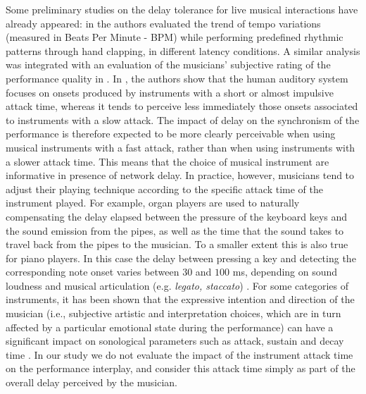 Some preliminary studies on the delay tolerance for live musical interactions have already appeared: in \cite{gurevich2004simulation,chafe2010effect,chafe2004effect,chafe2004network} the authors evaluated the trend of tempo variations (measured in Beats Per Minute - BPM) while performing predefined rhythmic patterns through hand clapping, in different latency conditions. A similar analysis was integrated with an evaluation of the musicians' subjective rating of the performance quality in \cite{carot2009towards}. In \cite{barbosa2011influence}, the authors show that the human auditory system focuses on onsets produced by instruments with a short or almost impulsive attack time, whereas it tends to perceive less immediately those onsets associated to instruments with a slow attack. The impact of delay on the synchronism of the performance is therefore expected to be more clearly perceivable when using musical instruments with a fast attack, rather than when using instruments with a slower attack time. This means that the choice of musical instrument are informative in presence of network delay. In practice, however, musicians tend to adjust their playing technique according to the specific attack time of the instrument played. For example, organ players are used to naturally compensating the delay elapsed between the pressure of the keyboard keys and the sound emission from the pipes, as well as the time that the sound takes to travel back from the pipes to the musician. To a smaller extent this is also true for piano players. In this case the delay between pressing a key and detecting the corresponding note onset varies between $30$ and $100$ ms, depending on sound loudness and musical articulation (e.g. \textit{legato, staccato}) \cite{askenfelt}. For some categories of instruments, it has been shown that the expressive intention and direction of the musician (i.e., subjective artistic and interpretation choices, which are in turn affected by a particular emotional state during the performance) can have a significant impact on sonological parameters such as attack, sustain and decay time \cite{clarinet}. In our study we do not evaluate the impact of the instrument attack time on the performance interplay, and consider this attack time simply as part of the overall delay perceived by the musician. 

